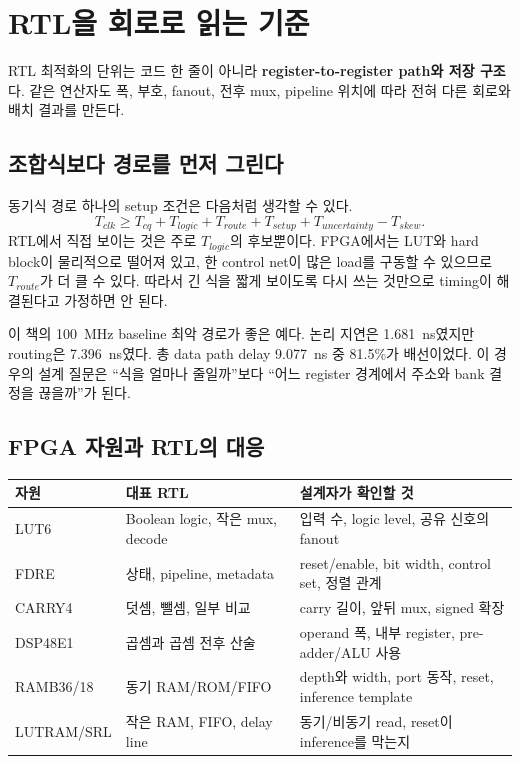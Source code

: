 \chapter{RTL을 회로로 읽는 기준}

\begin{summarybox}[이 장의 결론]
RTL 최적화의 단위는 코드 한 줄이 아니라 \textbf{register-to-register path와 저장
구조}다. 같은 연산자도 폭, 부호, fanout, 전후 mux, pipeline 위치에 따라 전혀
다른 회로와 배치 결과를 만든다.
\end{summarybox}

\section{조합식보다 경로를 먼저 그린다}

동기식 경로 하나의 setup 조건은 다음처럼 생각할 수 있다.
\[
T_{clk} \ge T_{cq}+T_{logic}+T_{route}+T_{setup}+T_{uncertainty}-T_{skew}.
\]
RTL에서 직접 보이는 것은 주로 $T_{logic}$의 후보뿐이다. FPGA에서는 LUT와
hard block이 물리적으로 떨어져 있고, 한 control net이 많은 load를 구동할 수
있으므로 $T_{route}$가 더 클 수 있다. 따라서 긴 식을 짧게 보이도록 다시 쓰는
것만으로 timing이 해결된다고 가정하면 안 된다.

이 책의 100~MHz baseline 최악 경로가 좋은 예다. 논리 지연은 1.681~ns였지만
routing은 7.396~ns였다. 총 data path delay 9.077~ns 중 81.5\%가 배선이었다.
이 경우의 설계 질문은 ``식을 얼마나 줄일까''보다 ``어느 register 경계에서
주소와 bank 결정을 끊을까''가 된다.

\section{FPGA 자원과 RTL의 대응}

\begin{longtable}{L{27mm}L{55mm}L{78mm}}
\toprule
자원 & 대표 RTL & 설계자가 확인할 것 \\
\midrule
\endhead
LUT6 & Boolean logic, 작은 mux, decode & 입력 수, logic level, 공유 신호의 fanout \\
FDRE & 상태, pipeline, metadata & reset/enable, bit width, control set, 정렬 관계 \\
CARRY4 & 덧셈, 뺄셈, 일부 비교 & carry 길이, 앞뒤 mux, signed 확장 \\
DSP48E1 & 곱셈과 곱셈 전후 산술 & operand 폭, 내부 register, pre-adder/ALU 사용 \\
RAMB36/18 & 동기 RAM/ROM/FIFO & depth와 width, port 동작, reset, inference template \\
LUTRAM/SRL & 작은 RAM, FIFO, delay line & 동기/비동기 read, reset이 inference를 막는지 \\
\bottomrule
\end{longtable}

